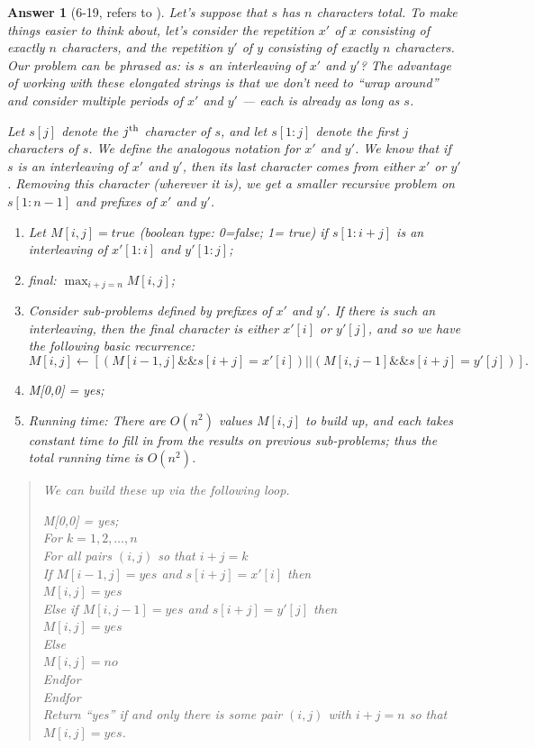 \documentclass[11pt]{article}
\theoremstyle{numberplain}
\theoremstyle{nonumberplain}
\newtheorem{ans}{Answer}
\newcommand{\dps}{\displaystyle}
\newcommand{\0}{{\mathbf{0}}}
\begin{document}
\begin{ans}[6-19, refers to \cite{solcornell}]
Let's suppose that $s$ has $n$ characters total.
To make things easier to think about, let's consider
the repetition $x'$ of $x$ consisting of exactly $n$ characters,
and the repetition $y'$ of $y$ consisting of exactly $n$ characters.
Our problem can be phrased as: is $s$ an interleaving of $x'$ and $y'$?
The advantage of working with these elongated strings
is that we don't need to ``wrap around'' and consider
multiple periods of $x'$ and $y'$ --- each is already as long as $s$.

Let $s[j]$ denote the $j^{\rm th}$ character of $s$, and let
$s[1:j]$ denote the first $j$ characters of $s$.
We define the analogous notation for $x'$ and $y'$.
We know that if $s$ is an interleaving of $x'$ and $y'$,
then its last character comes from either $x'$ or $y'$.
Removing this character (wherever it is), we get a 
smaller recursive problem on $s[1:n-1]$ and 
prefixes of $x'$ and $y'$.
\begin{enumerate}
\item Let $M[i,j] = true$ (boolean type: 0=false; 1=	true) if $s[1:i+j]$ is an interleaving
of $x'[1:i]$ and $y'[1:j]$;
\item final: $\dps \max_{i+j=n} M[i,j]$;
\item Consider sub-problems defined by prefixes of $x'$ and $y'$.
If there is such an interleaving, then the final character
is either $x'[i]$ or $y'[j]$, and so
we have the following basic recurrence:
$$M[i,j] \leftarrow \left[\left(M[i-1,j] \&\& s[i+j] = x'[i]\right)||\left( M[i,j-1] \&\& s[i+j] = y'[j]\right)\right].$$
\item M[0,0] = yes;
\item Running time: There are $O(n^2)$ values $M[i,j]$ to build up, and each
takes constant time to fill in from the results on
previous sub-problems; thus the total running time is $O(n^2)$.	
\end{enumerate}
\begin{quote}
We can build these up via the following loop.

\begin{code}
M[0,0] = yes;\\
For $k = 1, 2, \ldots, n$\\
  For all pairs $(i,j)$ so that $i + j = k$\\
    If $M[i-1,j] = yes$ and $s[i+j] = x'[i]$ then\\
      $M[i,j] = yes$\\
    Else if $M[i,j-1] = yes$ and $s[i+j] = y'[j]$ then\\
      $M[i,j] = yes$\\
    Else\\
      $M[i,j] = no$\\
  Endfor\\
Endfor\\
Return ``yes'' if and only there is some pair $(i,j)$ with $i+j = n$
  so that $M[i,j] = yes$.\\
\end{code}
\end{quote}
\end{ans}
\end{document}
